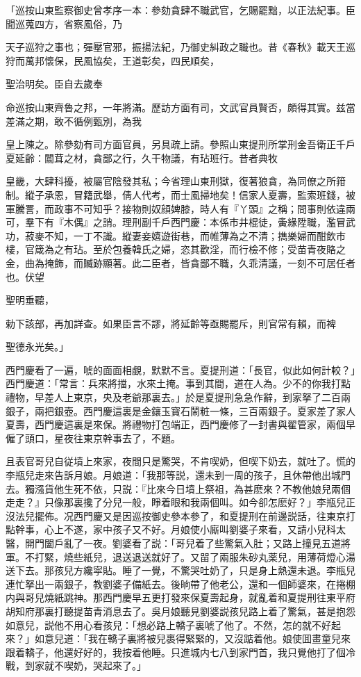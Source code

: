 \begin{myquote}[\markfont]
「巡按山東監察御史曾孝序一本：參劾貪肆不職武官，乞賜罷黜，以正法紀事。臣聞巡蒐四方，省察風俗，乃

天子巡狩之事也；彈壓官邪，振揚法紀，乃御史糾政之職也。昔《春秋》載天王巡狩而萬邦懷保，民風協矣，王道彰矣，四民順矣，

聖治明矣。臣自去歲奉

命巡按山東齊魯之邦，一年將滿。歷訪方面有司，文武官員賢否，頗得其實。兹當差滿之期，敢不循例甄別，為我

皇上陳之。除參劾有司方面官員，另具疏上請。參照山東提刑所掌刑金吾衛正千戶夏延齡：闒茸之材，貪鄙之行，久干物議，有玷班行。昔者典牧

皇畿，大肆科擾，被屬官陰發其私；今省理山東刑獄，復著狼貪，為同僚之所箝制。縱子承恩，冒籍武舉，倩人代考，而士風掃地矣！信家人夏壽，監索班錢，被軍騰詈，而政事不可知乎？接物則奴顔婢膝，時人有『丫頭』之稱；問事則依違兩可，羣下有『木偶』之誚。理刑副千戶西門慶：本係市井棍徒，夤緣陞職，濫冒武功，菽麥不知，一丁不識。縱妻妾嬉遊街巷，而帷薄為之不清；擕樂婦而酣飲市樓，官箴為之有玷。至於包養韓氏之婦，恣其歡淫，而行檢不修；受苗青夜賂之金，曲為掩飾，而贓跡顯著。此二臣者，皆貪鄙不職，久乖清議，一刻不可居任者也。伏望

聖明垂聽，

勅下該部，再加詳查。如果臣言不謬，將延齡等亟賜罷斥，則官常有賴，而裨

聖德永光矣。」
\end{myquote}

西門慶看了一遍，唬的面面相覷，默默不言。夏提刑道：「長官，似此如何計較？」西門慶道：「常言：兵來將擋，水來土掩。事到其間，道在人為。少不的你我打點禮物，早差人上東京，央及老爺那裏去。」於是夏提刑急急作辭，到家拏了二百兩銀子，兩把銀壺。西門慶這裏是金鑲玉寳石鬧粧一條，三百兩銀子。夏家差了家人夏壽，西門慶這裏是來保。將禮物打包端正，西門慶修了一封書與翟管家，兩個早僱了頭口，星夜往東京幹事去了，不題。

且表官哥兒自従墳上來家，夜間只是驚哭，不肯喫奶，但喫下奶去，就吐了。慌的李瓶兒走來告訴月娘。月娘道：「我那等説，還未到一周的孩子，且休帶他出城門去。獨漒貨他生死不依，只説：『比來今日墳上祭祖，為甚麽來？不教他娘兒兩個走走？』只像那裏攙了分兒一般，睜着眼和我兩個叫。如今卻怎麽好？」李瓶兒正沒法兒擺佈。况西門慶又是因巡按御史參本參了，和夏提刑在前邊説話，往東京打點幹事，心上不遂，家中孩子又不好。月娘使小廝叫劉婆子來看，又請小兒科太醫，開門闔戶亂了一夜。劉婆看了説：「哥兒着了些驚氣入肚；又路上撞見五道將軍。不打緊，燒些紙兒，退送退送就好了。又㽞了兩服朱砂丸薬兒，用薄荷燈心湯送下去。那孩兒方纔寜貼。睡了一覺，不驚哭吐奶了，只是身上熱還未退。李瓶兒連忙拏出一兩銀子，教劉婆子備紙去。後晌帶了他老公，還和一個師婆來，在捲棚内與哥兒燒紙跳神。那西門慶早五更打發來保夏壽起身，就亂着和夏提刑往東平府胡知府那裏打聽提苗青消息去了。吳月娘聽見劉婆説孩兒路上着了驚氣，甚是抱怨如意兒，説他不用心看孩兒：「想必路上轎子裏唬了他了。不然，怎的就不好起來？」如意兒道：「我在轎子裏將被兒裹得緊緊的，又沒踮着他。娘使囬畫童兒來跟着轎子，他還好好的，我按着他睡。只進城内七八到家門首，我只覺他打了個冷戰，到家就不喫奶，哭起來了。」

